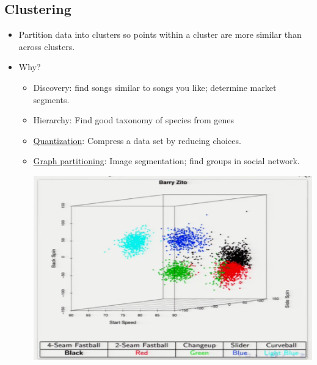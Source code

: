 \documentclass[10pt]{article}
\begin{document}
\subsection*{Clustering}
\begin{itemize}
	\item Partition data into clusters so points within a cluster are more similar than across clusters.
	\item Why?
	\begin{itemize}
		\item Discovery: find songs similar to songs you like; determine market segments.
		\item Hierarchy: Find good taxonomy of species from genes
		\item \underline{Quantization}: Compress a data set by reducing choices.
		\item \underline{Graph partitioning}: Image segmentation; find groups in social network.
		\begin{center}
			\includegraphics[scale=0.5]{../images/baseballclustering}
		\end{center}
	\end{itemize}
\end{itemize}
\end{document}
